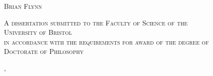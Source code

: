 \begin{titlepage}
{    }%
    \HRule %
    \vspace{2.5cm}
    
    \textsc{\LARGE Brian Flynn}%
    
    \vspace{2.5cm}
    \textsc{
        \normalsize A dissertation submitted to the Faculty of Science of the \\ 
        \vspace{0.15cm}
        \LARGE University of Bristol \\    
        \vspace{0.3cm}
        \normalsize in accordance with the requirements for award of the degree of \\
        \vspace{0.15cm}
        \LARGE Doctorate of Philosophy \\
    }
    
    \vspace{1.5cm}
    {\Large \monthname, \the\year}\\[1cm] %
    
    \end{titlepage}